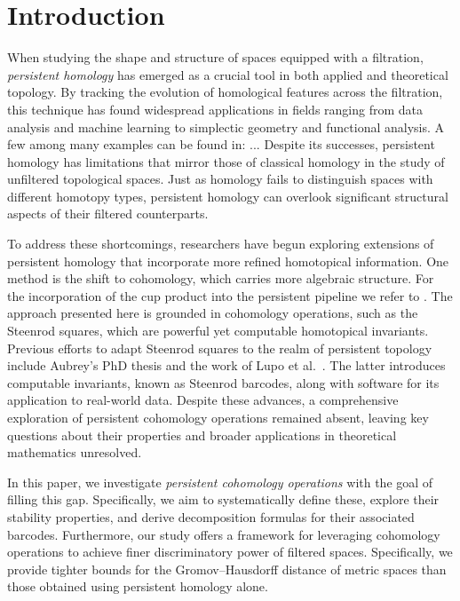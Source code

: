
\section{Introduction} \label{s:introduction}

When studying the shape and structure of spaces equipped with a filtration, \textit{persistent homology} has emerged as a crucial tool in both applied and theoretical topology.
By tracking the evolution of homological features across the filtration, this technique has found widespread applications in fields ranging from data analysis and machine learning to simplectic geometry and functional analysis.
A few among many examples can be found in: ... 
Despite its successes, persistent homology has limitations that mirror those of classical homology in the study of unfiltered topological spaces.
Just as homology fails to distinguish spaces with different homotopy types, persistent homology can overlook significant structural aspects of their filtered counterparts.

To address these shortcomings, researchers have begun exploring extensions of persistent homology that incorporate more refined homotopical information. One method is the shift to cohomology, which carries more algebraic structure.
For the incorporation of the cup product into the persistent pipeline we refer to \cite{contessoto_et_al:LIPIcs.SoCG.2022.31, memoli2024persistent, huang2005cup, yarmola2010persistence, herscovich2018higher, belchi2021a, contreras2022persistent}.
The approach presented here is grounded in cohomology operations, such as the Steenrod squares, which are powerful yet computable homotopical invariants.
Previous efforts to adapt Steenrod squares to the realm of persistent topology include Aubrey's PhD thesis \cite{aubrey2011thesis} and the work of Lupo et al.\ \cite{medina2022per_st}.
The latter introduces computable invariants, known as Steenrod barcodes, along with software for its application to real-world data.
Despite these advances, a comprehensive exploration of persistent cohomology operations remained absent, leaving key questions about their properties and broader applications in theoretical mathematics unresolved.

In this paper, we investigate \textit{persistent cohomology operations} with the goal of filling this gap.
Specifically, we aim to systematically define these, explore their stability properties, and derive decomposition formulas for their associated barcodes.
Furthermore, our study offers a framework for leveraging cohomology operations to achieve finer discriminatory power of filtered spaces.
Specifically, we provide tighter bounds for the Gromov--Hausdorff distance of metric spaces than those obtained using persistent homology alone.

